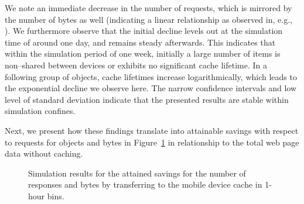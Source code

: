 \documentclass[letterpaper,conference]{IEEEtran}
\begin{document}
We note an immediate decrease in the number of requests, which is mirrored by the number of bytes as well (indicating a linear relationship as observed in, e.g., \cite{JoSe14Commag}).
We furthermore observe that the initial decline levels out at the simulation time of around one day, and  remains steady afterwards.
This indicates that within the simulation period of one week, initially a large number of items is non--shared between devices or exhibits no significant cache lifetime. 
In a following group of objects, cache lifetimes increase logarithmically, which leads to the exponential decline we observe here.
The narrow confidence intervals and low level of standard deviation indicate that the presented results are stable within simulation confines.
%

Next, we present how these findings translate into attainable savings with respect to requests for objects and bytes in Figure~\ref{fig:sim2} in relationship to the total web page data without caching.
\begin{figure}[]
	\centering
	\qquad
	\caption{Simulation results for the attained savings for the number of responses and bytes by transferring to the mobile device cache in 1-hour bins.}
	\label{fig:sim2}
\end{figure}
\end{document}
